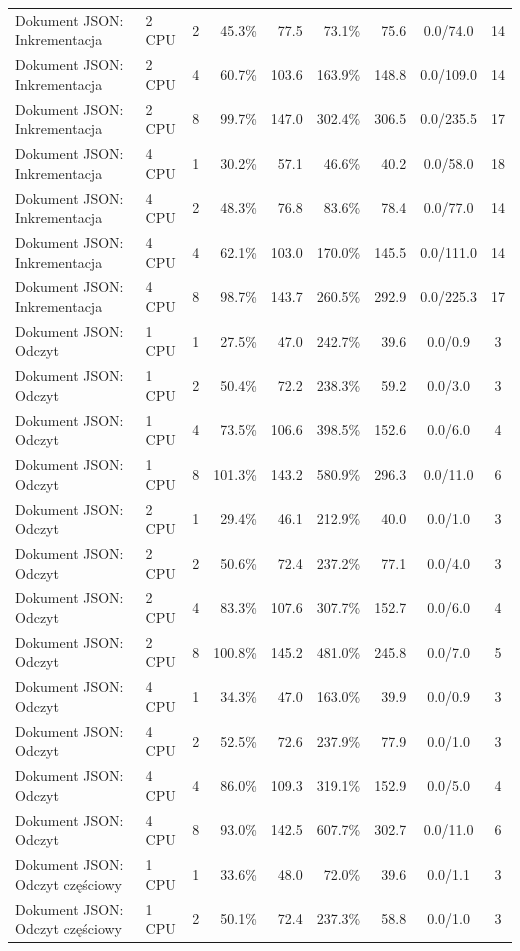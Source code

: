 \begin{table}[ht]
{\begin{tabular}{llcrrrrcc}
Dokument JSON: Inkrementacja & 2 CPU & 2 & 45.3\% & 77.5 & 73.1\% & 75.6 & 0.0/74.0 & 14 \\
Dokument JSON: Inkrementacja & 2 CPU & 4 & 60.7\% & 103.6 & 163.9\% & 148.8 & 0.0/109.0 & 14 \\
Dokument JSON: Inkrementacja & 2 CPU & 8 & 99.7\% & 147.0 & 302.4\% & 306.5 & 0.0/235.5 & 17 \\
Dokument JSON: Inkrementacja & 4 CPU & 1 & 30.2\% & 57.1 & 46.6\% & 40.2 & 0.0/58.0 & 18 \\
Dokument JSON: Inkrementacja & 4 CPU & 2 & 48.3\% & 76.8 & 83.6\% & 78.4 & 0.0/77.0 & 14 \\
Dokument JSON: Inkrementacja & 4 CPU & 4 & 62.1\% & 103.0 & 170.0\% & 145.5 & 0.0/111.0 & 14 \\
Dokument JSON: Inkrementacja & 4 CPU & 8 & 98.7\% & 143.7 & 260.5\% & 292.9 & 0.0/225.3 & 17 \\
Dokument JSON: Odczyt & 1 CPU & 1 & 27.5\% & 47.0 & 242.7\% & 39.6 & 0.0/0.9 & 3 \\
Dokument JSON: Odczyt & 1 CPU & 2 & 50.4\% & 72.2 & 238.3\% & 59.2 & 0.0/3.0 & 3 \\
Dokument JSON: Odczyt & 1 CPU & 4 & 73.5\% & 106.6 & 398.5\% & 152.6 & 0.0/6.0 & 4 \\
Dokument JSON: Odczyt & 1 CPU & 8 & 101.3\% & 143.2 & 580.9\% & 296.3 & 0.0/11.0 & 6 \\
Dokument JSON: Odczyt & 2 CPU & 1 & 29.4\% & 46.1 & 212.9\% & 40.0 & 0.0/1.0 & 3 \\
Dokument JSON: Odczyt & 2 CPU & 2 & 50.6\% & 72.4 & 237.2\% & 77.1 & 0.0/4.0 & 3 \\
Dokument JSON: Odczyt & 2 CPU & 4 & 83.3\% & 107.6 & 307.7\% & 152.7 & 0.0/6.0 & 4 \\
Dokument JSON: Odczyt & 2 CPU & 8 & 100.8\% & 145.2 & 481.0\% & 245.8 & 0.0/7.0 & 5 \\
Dokument JSON: Odczyt & 4 CPU & 1 & 34.3\% & 47.0 & 163.0\% & 39.9 & 0.0/0.9 & 3 \\
Dokument JSON: Odczyt & 4 CPU & 2 & 52.5\% & 72.6 & 237.9\% & 77.9 & 0.0/1.0 & 3 \\
Dokument JSON: Odczyt & 4 CPU & 4 & 86.0\% & 109.3 & 319.1\% & 152.9 & 0.0/5.0 & 4 \\
Dokument JSON: Odczyt & 4 CPU & 8 & 93.0\% & 142.5 & 607.7\% & 302.7 & 0.0/11.0 & 6 \\
Dokument JSON: Odczyt częściowy & 1 CPU & 1 & 33.6\% & 48.0 & 72.0\% & 39.6 & 0.0/1.1 & 3 \\
Dokument JSON: Odczyt częściowy & 1 CPU & 2 & 50.1\% & 72.4 & 237.3\% & 58.8 & 0.0/1.0 & 3 \\

\end{tabular}}
\end{table}
